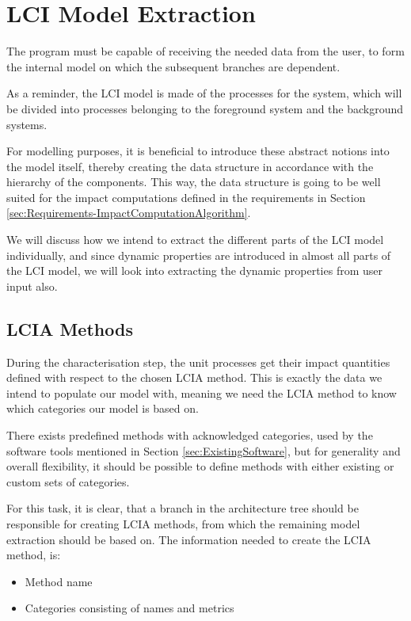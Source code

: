 \section{LCI Model Extraction}\label{sec:Design-ModelExtraction}

The program must be capable of receiving the needed data from the user, to form the internal model on which the subsequent branches are dependent. 

As a reminder, the LCI model is made of the processes for the system, which will be divided into processes belonging to the foreground system and the background systems. 

For modelling purposes, it is beneficial to introduce these abstract notions into the model itself, thereby creating the data structure in accordance with the hierarchy of the components. This way, the data structure is going to be well suited for the impact computations defined in the requirements in Section \ref{sec:Requirements-ImpactComputationAlgorithm}. 

We will discuss how we intend to extract the different parts of the LCI model individually, and since dynamic properties are introduced in almost all parts of the LCI model, we will look into extracting the dynamic properties from user input also. 

\subsection{LCIA Methods} \label{ssec:Design-LCIAMethods}
During the characterisation step, the unit processes get their impact quantities defined with respect to the chosen LCIA method. This is exactly the data we intend to populate our model with, meaning we need the LCIA method to know which categories our model is based on. 

There exists predefined methods with acknowledged categories, used by the software tools mentioned in Section \ref{sec:ExistingSoftware}, but for generality and overall flexibility, it should be possible to define methods with either existing or custom sets of categories. 

For this task, it is clear, that a branch in the architecture tree should be responsible for creating LCIA methods, from which the remaining model extraction should be based on. The information needed to create the LCIA method, is:

\begin{itemize}
    \item Method name
    \item Categories consisting of names and metrics
\end{itemize}

